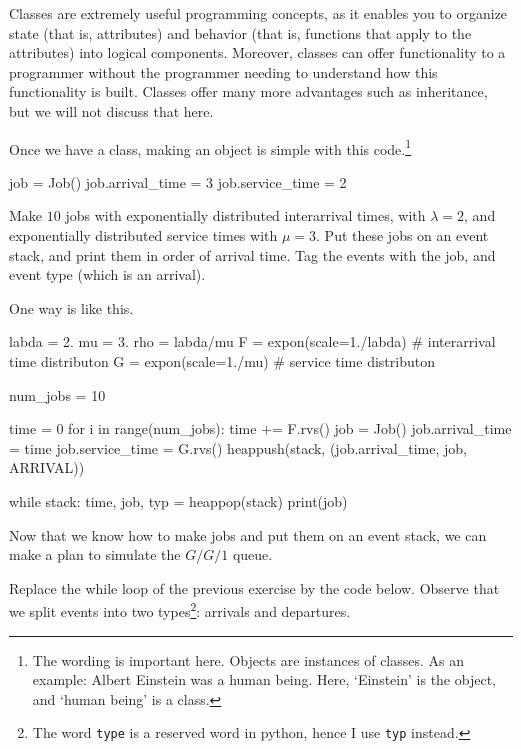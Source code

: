 \documentclass{scrartcl}
\begin{document}
Classes are extremely useful programming concepts, as it enables you to organize state (that is, attributes) and behavior (that is, functions that apply to the attributes) into logical components. Moreover, classes can offer functionality to a programmer without the programmer needing to understand how this functionality is built. Classes offer many more advantages such as inheritance, but we will not discuss that here. 

Once we have a class, making an object is simple with this code.\footnote{The wording is important here. Objects are instances of classes. As an example: Albert Einstein was a human being. Here, `Einstein' is the object, and `human being' is a class.}

\begin{pyblock}
job = Job()
job.arrival_time = 3
job.service_time = 2
\end{pyblock}

\begin{exercise}\label{ex:3}
  Make $10$ jobs with exponentially distributed interarrival times, with $\lambda=2$,  and exponentially distributed service times with $\mu=3$. Put these jobs on an event stack, and print them in order of arrival time. Tag the events with the job, and event type (which is an arrival).
  \begin{solution}
One way is like this.     
    \begin{pyblock}
labda = 2.
mu = 3.
rho = labda/mu
F = expon(scale=1./labda)  # interarrival time distributon
G = expon(scale=1./mu)  # service time distributon

num_jobs = 10

time = 0
for i in range(num_jobs):
    time += F.rvs()
    job = Job()
    job.arrival_time = time
    job.service_time = G.rvs()
    heappush(stack, (job.arrival_time, job, ARRIVAL))


while stack:
    time, job, typ = heappop(stack)
    print(job)
    
    \end{pyblock}
  \end{solution}
\end{exercise}

Now that we know how to make jobs and put them on an event stack, we can make a plan to simulate the $G/G/1$ queue. 

  Replace the while loop of the previous exercise by the code below. Observe that we split events into two types\footnote{The word \texttt{type} is a reserved word in python, hence I use \texttt{typ} instead.}: arrivals and departures. 
\end{document}
